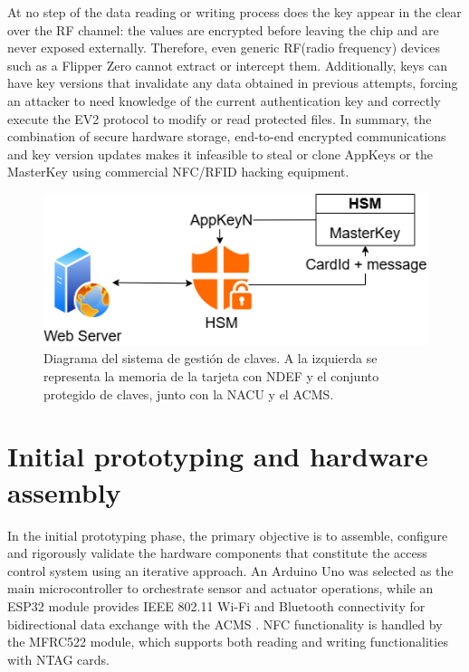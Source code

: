 At no step of the data reading or writing process does the key appear in the clear
over the RF channel: the values are encrypted before leaving the chip and are never
exposed externally. Therefore, even generic RF(radio frequency) devices such as a
Flipper Zero \cite{ref51} cannot extract or intercept them. Additionally, keys can have key
versions that invalidate any data obtained in previous attempts, forcing an attacker to
need knowledge of the current authentication key and correctly execute the EV2
protocol to modify or read protected files. In summary, the combination of secure
hardware storage, end-to-end encrypted communications and key version updates
makes it infeasible to steal or clone AppKeys or the MasterKey using commercial
NFC/RFID hacking equipment.
\begin{figure}[H]
	\centering
	\includegraphics[width=\textwidth]{imaxes/KEY_MANA}
	\caption{Diagrama del sistema de gestión de claves. A la izquierda se representa la memoria de la tarjeta con NDEF y el conjunto protegido de claves, junto con la NACU y el ACMS.}
	\label{fig:key_management}
\end{figure}

\section{Initial prototyping and hardware assembly}
\label{sec:NACU1}

In the initial prototyping phase, the primary objective is to assemble, configure and rigorously validate the hardware components that constitute the access control system using an iterative approach. An Arduino Uno was selected as the main microcontroller to orchestrate sensor and actuator operations, while an ESP32 module provides IEEE 802.11 Wi-Fi and Bluetooth connectivity for bidirectional data exchange with the ACMS \cite{ref45}. NFC functionality is handled by the MFRC522 module, which supports both reading and writing functionalities with NTAG cards.

